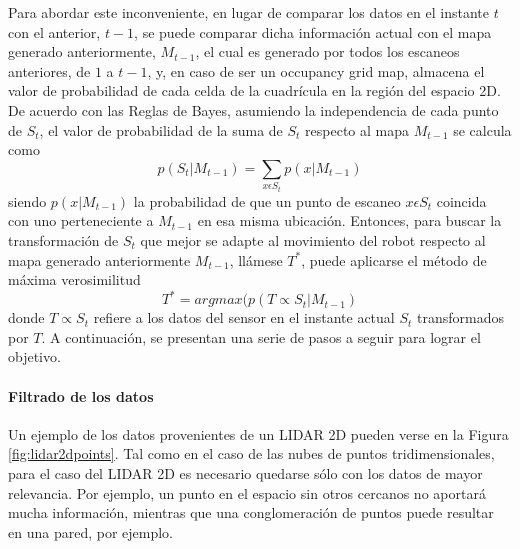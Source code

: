 Para abordar este inconveniente, en lugar de comparar los datos en el instante $t$ con el anterior, $t - 1$, se puede comparar dicha información actual con el mapa generado anteriormente, $M_{t-1}$, el cual es generado por todos los escaneos anteriores, de $1$ a $t-1$, y, en caso de ser un occupancy grid map, almacena el valor de probabilidad de cada celda de la cuadrícula en la región del espacio 2D. De acuerdo con las Reglas de Bayes, asumiendo la independencia de cada punto de $S_t$, el valor de probabilidad de la suma de $S_t$ respecto al mapa $M_{t-1}$ se calcula como
\begin{equation}
    p(S_t|M_{t-1}) = \sum_{x\epsilon S_t} p(x|M_{t-1})
\end{equation}
siendo $p(x|M_{t-1})$ la probabilidad de que un punto de escaneo $x \epsilon S_t$ coincida con uno perteneciente a $M_{t-1}$ en esa misma ubicación. Entonces, para buscar la transformación de $S_t$ que mejor se adapte al movimiento del robot respecto al mapa generado anteriormente $M_{t-1}$, llámese $T^*$, puede aplicarse el método de máxima verosimilitud
\begin{equation}
    T^* = argmax(p(T\propto S_t|M_{t-1})
\end{equation}
donde $T\propto S_t$ refiere a los datos del sensor en el instante actual $S_t$ transformados por $T$. A continuación, se presentan una serie de pasos a seguir para lograr el objetivo.

\paragraph{Filtrado de los datos}
Un ejemplo de los datos provenientes de un LIDAR 2D pueden verse en la Figura \ref{fig:lidar2dpoints}. Tal como en el caso de las nubes de puntos tridimensionales, para el caso del LIDAR 2D es necesario quedarse sólo con los datos de mayor relevancia. Por ejemplo, un punto en el espacio sin otros cercanos no aportará mucha información, mientras que una conglomeración de puntos puede resultar en una pared, por ejemplo.

